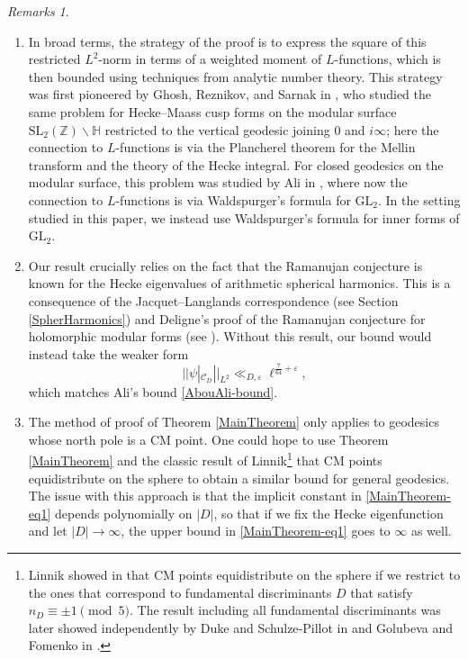 \documentclass[11pt]{amsart}
\theoremstyle{definition}
\theoremstyle{remark}
\newtheorem{remarks}[theorem]{Remarks}
\begin{document}
\begin{remarks}$ $
\begin{enumerate}
    \item[(1)] In broad terms, the strategy of the proof is to express the square of this restricted $L^2$-norm in terms of a weighted moment of $L$-functions, which is then bounded using techniques from analytic number theory. This strategy was first pioneered by Ghosh, Reznikov, and Sarnak in \cite{GhoshReznikovSarnak}, who studied the same problem for Hecke--Maass cusp forms on the modular surface $\mathrm{SL}_{2}(\mathbb{Z}) \backslash \mathbb{H}$ restricted to the vertical geodesic joining $0$ and $i\infty$; here the connection to $L$-functions is via the Plancherel theorem for the Mellin transform and the theory of the Hecke integral. For closed geodesics on the modular surface, this problem was studied by Ali in \cite{DanaMScThesis}, where now the connection to $L$-functions is via Waldspurger's formula for $\mathrm{GL}_2$. In the setting studied in this paper, we instead use Waldspurger's formula for inner forms of $\mathrm{GL}_2$.
    \item[(2)] Our result crucially relies on the fact that the Ramanujan conjecture is known for the Hecke eigenvalues of arithmetic spherical harmonics. This is a consequence of the Jacquet--Langlands correspondence (see Section \ref{SpherHarmonics}) and Deligne's proof of the Ramanujan conjecture for holomorphic modular forms (see \cite{Deligne-WeilConj}). Without this result, our bound would instead take the weaker form $$||\psi|_{\mathcal{C}_D}||_{L^2} \ll_{D,\varepsilon} \ell^{\frac{7}{64} + \varepsilon},$$ which matches Ali's bound \eqref{AbouAli-bound}.
    \item[(3)] The method of proof of Theorem \ref{MainTheorem} only applies to geodesics whose north pole is a CM point. One could hope to use Theorem \ref{MainTheorem} and the classic result of Linnik\footnote{Linnik showed in \cite{Linnik} that CM points equidistribute on the sphere if we restrict to the ones that correspond to fundamental discriminants $D$ that satisfy $n_D \equiv \pm 1 \pmod{5}$. The result including all fundamental discriminants was later showed independently by Duke and Schulze-Pillot in \cite{DukeSchulzePillot} and Golubeva and Fomenko in \cite{GolubevaFomenko}.} that CM points equidistribute on the sphere to obtain a similar bound for general geodesics. The issue with this approach is that the implicit constant in \eqref{MainTheorem-eq1} depends polynomially on $|D|$, so that if we fix the Hecke eigenfunction and let $|D|\rightarrow \infty$, the upper bound in \eqref{MainTheorem-eq1} goes to $\infty$ as well.

\end{enumerate}
\end{remarks}
\end{document}
